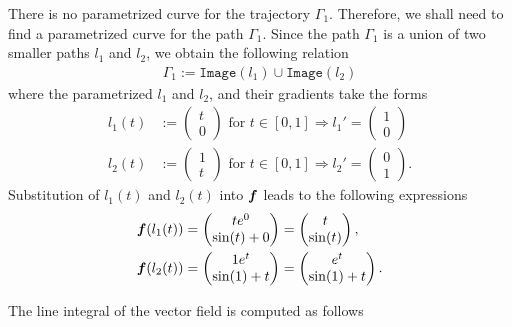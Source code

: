 \documentclass[12pt]{article}
\begin{document}
\begin{observationboxed}
	There is no parametrized curve for the trajectory $\Gamma_1$.
	Therefore, we shall need to find a parametrized curve for the path $\Gamma_1$.
	Since the path $\Gamma_1$ is a union of two smaller paths $l_1$ and $l_2$,
	we obtain the following relation
	\begin{align*}
		\boxed{
			\Gamma_1 := \texttt{Image}(l_1) \cup \texttt{Image}(l_2)
		}
	\end{align*}
	where the parametrized $l_1$ and $l_2$, and their gradients take the forms
	\begin{align*}
		l_1(t) & := \begin{pmatrix} t \\ 0 \end{pmatrix}
		\text{ for } t \in [0,1]
		\Rightarrow l_1' 
		= \begin{pmatrix} 1 \\ 0 \end{pmatrix}           \\
		l_2(t) & := \begin{pmatrix} 1 \\ t \end{pmatrix}
		\text{ for } t \in [0,1]
		\Rightarrow l_2' 
		= \begin{pmatrix} 0 \\ 1 \end{pmatrix}.
	\end{align*}
	Substitution of $l_1(t)$ and $l_2(t)$ into ${\boldsymbol{\mathnormal f}}$ leads to the following expressions
	\begin{align*}
		{\boldsymbol{\mathnormal f}}(l_1(t)) & 
		= \begin{pmatrix} t e^0 \\ \sin(t) + 0 \end{pmatrix}
		= \begin{pmatrix} t \\ \sin(t) \end{pmatrix}, \\
		{\boldsymbol{\mathnormal f}}(l_2(t)) & 
		= \begin{pmatrix} 1 e^t \\ \sin(1) + t \end{pmatrix}
		= \begin{pmatrix} e^t \\ \sin(1) + t \end{pmatrix}.
	\end{align*}
\end{observationboxed}
The line integral of the vector field is computed as follows
\end{document}
